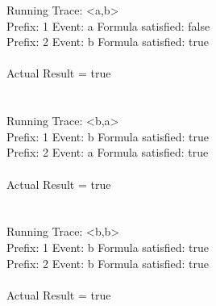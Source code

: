 \newpage

\noindent Running Trace: \textless a,b\textgreater\\
  Prefix: 1 Event: a Formula satisfied: false\\
  Prefix: 2 Event: b Formula satisfied: true\\
\\
Actual Result = true\\
\\
\\
Running Trace: \textless b,a\textgreater\\
  Prefix: 1 Event: b Formula satisfied: true\\
  Prefix: 2 Event: a Formula satisfied: true\\
\\
Actual Result = true\\
\\
\\
Running Trace: \textless b,b\textgreater\\
  Prefix: 1 Event: b Formula satisfied: true\\
  Prefix: 2 Event: b Formula satisfied: true\\
\\
Actual Result = true\\
